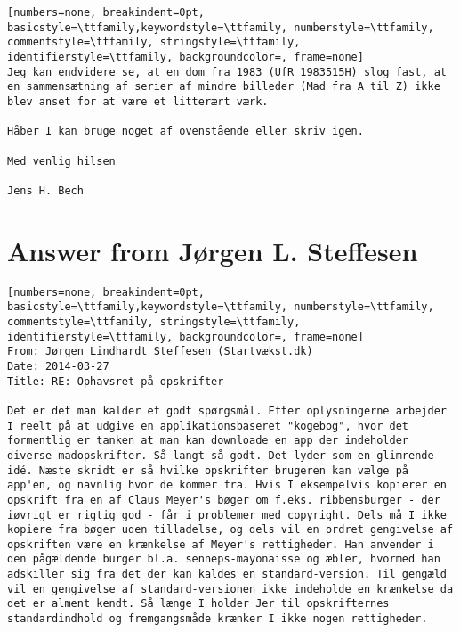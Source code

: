 \begin{lstlisting}[numbers=none, breakindent=0pt, basicstyle=\ttfamily,keywordstyle=\ttfamily, numberstyle=\ttfamily, commentstyle=\ttfamily, stringstyle=\ttfamily, identifierstyle=\ttfamily, backgroundcolor=, frame=none]
Jeg kan endvidere se, at en dom fra 1983 (UfR 1983515H) slog fast, at en sammensætning af serier af mindre billeder (Mad fra A til Z) ikke blev anset for at være et litterært værk.
 
Håber I kan bruge noget af ovenstående eller skriv igen.
 
Med venlig hilsen
 
Jens H. Bech
\end{lstlisting}

\newpage

\section*{Answer from Jørgen L. Steffesen}
\begin{lstlisting}[numbers=none, breakindent=0pt, basicstyle=\ttfamily,keywordstyle=\ttfamily, numberstyle=\ttfamily, commentstyle=\ttfamily, stringstyle=\ttfamily, identifierstyle=\ttfamily, backgroundcolor=, frame=none]
From: Jørgen Lindhardt Steffesen (Startvækst.dk)
Date: 2014-03-27
Title: RE: Ophavsret på opskrifter

Det er det man kalder et godt spørgsmål. Efter oplysningerne arbejder I reelt på at udgive en applikationsbaseret "kogebog", hvor det formentlig er tanken at man kan downloade en app der indeholder diverse madopskrifter. Så langt så godt. Det lyder som en glimrende idé. Næste skridt er så hvilke opskrifter brugeren kan vælge på app'en, og navnlig hvor de kommer fra. Hvis I eksempelvis kopierer en opskrift fra en af Claus Meyer's bøger om f.eks. ribbensburger - der iøvrigt er rigtig god - får i problemer med copyright. Dels må I ikke kopiere fra bøger uden tilladelse, og dels vil en ordret gengivelse af opskriften være en krænkelse af Meyer's rettigheder. Han anvender i den pågældende burger bl.a. senneps-mayonaisse og æbler, hvormed han adskiller sig fra det der kan kaldes en standard-version. Til gengæld vil en gengivelse af standard-versionen ikke indeholde en krænkelse da det er alment kendt. Så længe I holder Jer til opskrifternes standardindhold og fremgangsmåde krænker I ikke nogen rettigheder.
\end{lstlisting}